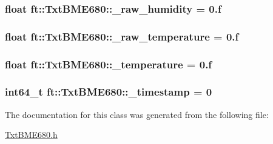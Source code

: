\subsubsection[{\texorpdfstring{\+\_\+raw\+\_\+humidity}{_raw_humidity}}]{\setlength{\rightskip}{0pt plus 5cm}float ft\+::\+Txt\+B\+M\+E680\+::\+\_\+raw\+\_\+humidity = 0.f}\hypertarget{classft_1_1_txt_b_m_e680_a4801e5e34a976e5771fe8a2ca20e0b78}{}\label{classft_1_1_txt_b_m_e680_a4801e5e34a976e5771fe8a2ca20e0b78}
\subsubsection[{\texorpdfstring{\+\_\+raw\+\_\+temperature}{_raw_temperature}}]{\setlength{\rightskip}{0pt plus 5cm}float ft\+::\+Txt\+B\+M\+E680\+::\+\_\+raw\+\_\+temperature = 0.f}\hypertarget{classft_1_1_txt_b_m_e680_a3fee3e0dc5cd6d47a0c86762cbfd6dc1}{}\label{classft_1_1_txt_b_m_e680_a3fee3e0dc5cd6d47a0c86762cbfd6dc1}
\subsubsection[{\texorpdfstring{\+\_\+temperature}{_temperature}}]{\setlength{\rightskip}{0pt plus 5cm}float ft\+::\+Txt\+B\+M\+E680\+::\+\_\+temperature = 0.f}\hypertarget{classft_1_1_txt_b_m_e680_ae810396be41cb787111ed00c4d1ef227}{}\label{classft_1_1_txt_b_m_e680_ae810396be41cb787111ed00c4d1ef227}
\subsubsection[{\texorpdfstring{\+\_\+timestamp}{_timestamp}}]{\setlength{\rightskip}{0pt plus 5cm}int64\+\_\+t ft\+::\+Txt\+B\+M\+E680\+::\+\_\+timestamp = 0}\hypertarget{classft_1_1_txt_b_m_e680_a783269ac820707b6902c839d148d582e}{}\label{classft_1_1_txt_b_m_e680_a783269ac820707b6902c839d148d582e}


The documentation for this class was generated from the following file\+:\begin{DoxyCompactItemize}
\item 
\hyperlink{_txt_b_m_e680_8h}{Txt\+B\+M\+E680.\+h}\end{DoxyCompactItemize}
